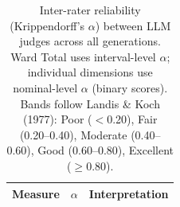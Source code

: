 \begin{table}[htbp]
  \centering
  \caption{Inter-rater reliability (Krippendorff's $\alpha$) between LLM judges across all generations. Ward Total uses interval-level $\alpha$; individual dimensions use nominal-level $\alpha$ (binary scores). Bands follow Landis \& Koch (1977): Poor ($<$0.20), Fair (0.20--0.40), Moderate (0.40--0.60), Good (0.60--0.80), Excellent ($\geq$0.80).}
  \small
  \label{tab:reliability_full}
  \begin{tabular}{lcc}
    \toprule
    Measure & $\alpha$ & Interpretation \\
    \midrule
    \bottomrule
  \end{tabular}
\end{table}
